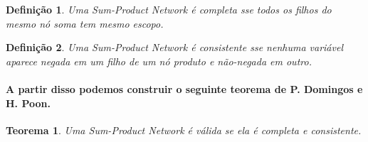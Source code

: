 \documentclass[a4paper,10pt]{article}
\theoremstyle{plain}
\newtheorem{spn-def}{Definição}
\newtheorem{spn-thm}{Teorema}
\begin{document}
\begin{spn-def} Uma Sum-Product Network é \emph{completa} sse todos os filhos do mesmo nó soma tem
  mesmo escopo.
\end{spn-def}

\begin{spn-def} Uma Sum-Product Network é \emph{consistente} sse nenhuma variável aparece negada em
  um filho de um nó produto e não-negada em outro.
\end{spn-def}

\paragraph{
  A partir disso podemos construir o seguinte teorema de P. Domingos e H. Poon\cite{poon-domingos}.
}

\begin{spn-thm} Uma Sum-Product Network é válida se ela é completa e consistente.
\end{spn-thm}
\end{document}

